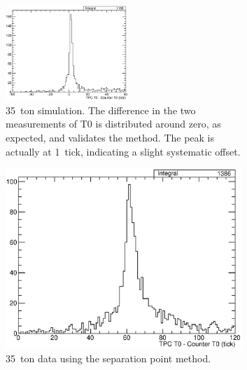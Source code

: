 \begin{figure}
  \centering
  \begin{subfigure}[t]{\linewidth}
    \centering
    \includegraphics[width=0.51\textwidth]{TPCCounterT0DifferenceMC.eps}
    \caption{35~ton simulation.  The difference in the two measurements of T0 is distributed around zero, as expected, and validates the method.  The peak is actually at 1~tick, indicating a slight systematic offset.}
    \label{fig:TPCCounterT0DifferenceMC}
  \end{subfigure}
  \vfill
  \begin{subfigure}[t]{0.48\linewidth}
    \centering
    \includegraphics[width=0.98\textwidth]{TPCCounterT0DifferenceData.eps}
    \caption{35~ton data using the separation point method.}
    \label{fig:TPCCounterT0DifferenceData}
  \end{subfigure}
  \hfill
  \begin{subfigure}[t]{0.48\linewidth}
    \centering

\end{subfigure}
\end{figure}
